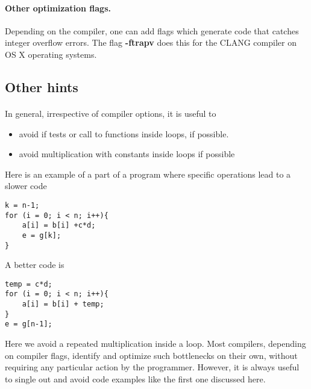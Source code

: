 \documentclass[%
oneside,                 %
final,                   %
10pt]{article}
\begin{document}
\paragraph{Other optimization flags.}
Depending on the compiler, one can add flags which generate code that catches integer overflow errors. 
The flag \textbf{-ftrapv} does this for the CLANG compiler on OS X operating systems.





\subsection*{Other hints}

\paragraph{}
In general, irrespective of compiler options, it is useful to
\begin{itemize}
\item avoid if tests or call to functions inside loops, if possible. 

\item avoid multiplication with constants inside loops if possible
\end{itemize}

\noindent
Here is an example of a part of a program where specific operations lead to a slower code
\begin{verbatim}
k = n-1;
for (i = 0; i < n; i++){
    a[i] = b[i] +c*d;
    e = g[k];
}
\end{verbatim}
A better code is
\begin{verbatim}
temp = c*d;
for (i = 0; i < n; i++){
    a[i] = b[i] + temp;
}
e = g[n-1];
\end{verbatim}
Here we avoid a repeated multiplication inside a loop. 
Most compilers, depending on compiler flags, identify and optimize such bottlenecks on their own, without requiring any particular action by the programmer. However, it is always useful to single out and avoid code examples like the first one discussed here.
\end{document}
